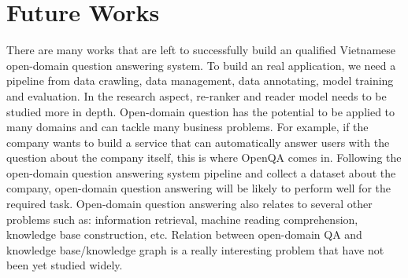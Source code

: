 \documentclass[12pt, sort&compress]{report}
\begin{document}
\section{Future Works}
There are many works that are left to successfully build an qualified Vietnamese open-domain question answering system. To build an real application, we need a pipeline from data crawling, data management, data annotating, model training and evaluation. In the research aspect, re-ranker and reader model needs to be studied more in depth. Open-domain question has the potential to be applied to many domains and can tackle many business problems. For example, if the company wants to build a service that can automatically answer users with the question about the company itself, this is where OpenQA comes in. Following the open-domain question answering system pipeline and collect a dataset about the company, open-domain question answering will be likely to perform well for the required task. Open-domain question answering also relates to several other problems such as: information retrieval, machine reading comprehension, knowledge base construction, etc. Relation between open-domain QA and knowledge base/knowledge graph is a really interesting problem that have not been yet studied widely.
\newpage


\end{document}
